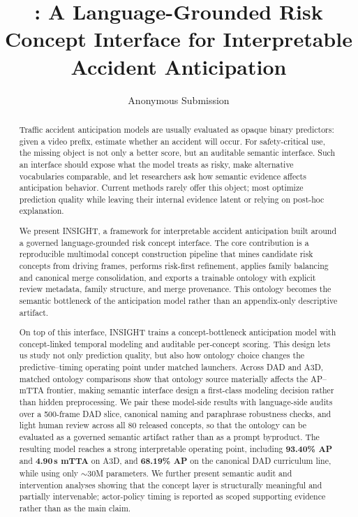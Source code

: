 \documentclass[11pt]{article}
\title{\method: A Language-Grounded Risk Concept Interface for Interpretable Accident Anticipation}
\author{Anonymous Submission}
\newcommand{\method}{\textsc{INSIGHT}}
\begin{document}
\maketitle

\begin{abstract}
Traffic accident anticipation models are usually evaluated as opaque binary
predictors: given a video prefix, estimate whether an accident will occur.
For safety-critical use, the missing object is not only a better score, but an
auditable semantic interface. Such an interface should expose what the model
treats as risky, make alternative vocabularies comparable, and let researchers
ask how semantic evidence affects anticipation behavior. Current methods rarely
offer this object; most optimize prediction quality while leaving their
internal evidence latent or relying on post-hoc explanation.

We present \method{}, a framework for interpretable accident anticipation built
around a governed language-grounded risk concept interface. The core
contribution is a reproducible multimodal concept construction pipeline that
mines candidate risk concepts from driving frames, performs risk-first
refinement, applies family balancing and canonical merge consolidation, and
exports a trainable ontology with explicit review metadata, family structure,
and merge provenance. This ontology becomes the semantic bottleneck of the
anticipation model rather than an appendix-only descriptive artifact.

On top of this interface, \method{} trains a concept-bottleneck anticipation
model with concept-linked temporal modeling and auditable per-concept scoring.
This design lets us study not only prediction quality, but also how ontology
choice changes the predictive--timing operating point under matched launchers.
Across DAD and A3D, matched ontology comparisons show that ontology source
materially affects the AP--mTTA frontier, making semantic interface design a
first-class modeling decision rather than hidden preprocessing. We pair these
model-side results with language-side audits over a 500-frame DAD slice,
canonical naming and paraphrase robustness checks, and light human review
across all 80 released concepts, so that the ontology can be evaluated as a
governed semantic artifact rather than as a prompt byproduct. The resulting model
reaches a strong interpretable operating point, including \textbf{93.40\% AP}
and \textbf{4.90\,s mTTA} on A3D, and \textbf{68.19\% AP} on the canonical DAD
curriculum line, while using only $\sim$30M parameters. We further present
semantic audit and intervention analyses showing that the concept layer is
structurally meaningful and partially intervenable; actor-policy timing is
reported as scoped supporting evidence rather than as the main claim.
\end{abstract}







\clearpage
\appendix


\clearpage

\end{document}
